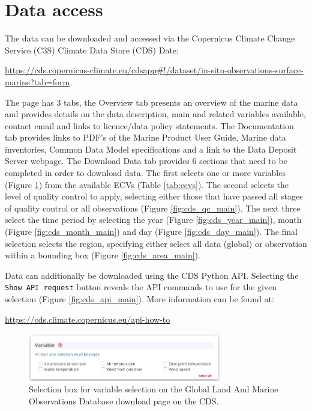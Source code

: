 \section{Data access}
The data can be downloaded and accessed via the Copernicus Climate Change Service (C3S) Climate Data Store (CDS) Date:
\begin{center}
\sloppy\url{https://cds.copernicus-climate.eu/cdsapp\#!/dataset/in-situ-observations-surface-marine?tab=form}.
 \end{center}
The page has 3 tabs, the Overview tab presents an overview of the marine data and provides details on the data description, main and related variables available, contact email and links to licence/data policy statements. 
The Documentation tab provides links to PDF’s of the Marine Product User Guide, Marine data inventories, Common Data Model specifications and a link to the Data Deposit Server webpage. The Download Data tab provides 6 sections that need to be completed in order to download data. The first selects one or more variables (Figure \ref{fig:cds_variable_main}) from the available ECVs (Table \ref{tab:ecvs}). The second selects the level of quality control to apply, selecting either those that have passed all stages of quality control or all observations (Figure \ref{fig:cds_qc_main}). The next three select the time period  by selecting the year (Figure \ref{fig:cds_year_main}), month (Figure \ref{fig:cds_month_main}) and day (Figure \ref{fig:cds_day_main}). The final selection selects the region, specifying either select all data (global) or observation within a bounding box (Figure \ref{fig:cds_area_main}).

Data can additionally be downloaded using the CDS Python API. Selecting the \texttt{Show API request} button reveals the API commands to use for the given selection (Figure \ref{fig:cds_api_main}). More information can be found at:

\begin{center}
\url{https://cds.climate.copernicus.eu/api-how-to}
\end{center}

\begin{figure}
\begin{center}
\includegraphics[width=0.75\textwidth]{resources/cds_variable_select.png}
\caption{Selection box for variable selection on the Global Land And Marine Observations Database download page on the CDS.}
\label{fig:cds_variable_main}
\end{center}
\end{figure}


